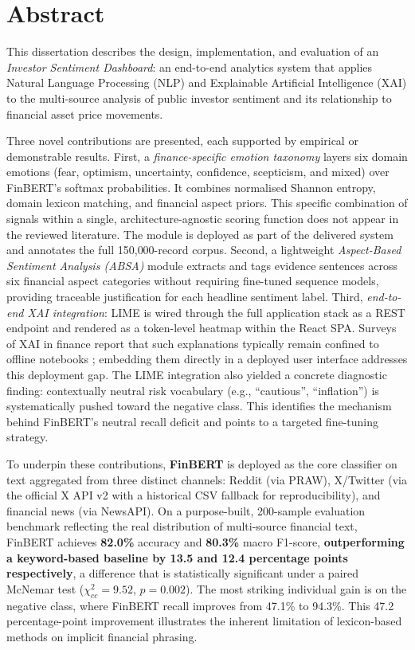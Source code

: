 \chapter*{Abstract}

This dissertation describes the design, implementation, and evaluation of an
\textit{Investor Sentiment Dashboard}: an end-to-end analytics system that applies
Natural Language Processing (NLP) and Explainable Artificial Intelligence (XAI)
to the multi-source analysis of public investor sentiment and its relationship to
financial asset price movements.

Three novel contributions are presented, each supported by empirical or
demonstrable results.
First, a \textit{finance-specific emotion taxonomy} layers six domain emotions
(fear, optimism, uncertainty, confidence, scepticism, and mixed) over FinBERT's
softmax probabilities. It combines normalised Shannon entropy, domain lexicon
matching, and financial aspect priors.
This specific combination of signals within a single, architecture-agnostic
scoring function does not appear in the reviewed literature. The module is
deployed as part of the delivered system and annotates the full
150{,}000-record corpus.
Second, a lightweight \textit{Aspect-Based Sentiment Analysis (ABSA)} module
extracts and tags evidence sentences across six financial aspect categories without
requiring fine-tuned sequence models, providing traceable justification for each
headline sentiment label.
Third, \textit{end-to-end XAI integration}: LIME \citep{ribeiro2016lime} is
wired through the full application stack as a REST endpoint and rendered as a
token-level heatmap within the React SPA. Surveys of XAI in finance report
that such explanations typically remain confined to offline notebooks
\citep{yeo2023xai, biswas2024xai}; embedding them directly in a deployed user
interface addresses this deployment gap.
The LIME integration also yielded a concrete diagnostic finding: contextually
neutral risk vocabulary (e.g., ``cautious'', ``inflation'') is systematically
pushed toward the negative class. This identifies the mechanism behind
FinBERT's neutral recall deficit and points to a targeted fine-tuning strategy.

To underpin these contributions, \textbf{FinBERT} \citep{araci2019finbert} is
deployed as the core classifier on text aggregated from three distinct channels:
Reddit (via PRAW), X/Twitter (via the official X API v2 with a historical CSV
fallback for reproducibility), and financial news (via NewsAPI).
On a purpose-built, 200-sample evaluation benchmark reflecting the real
distribution of multi-source financial text, FinBERT achieves \textbf{82.0\%}
accuracy and \textbf{80.3\%} macro F1-score, \textbf{outperforming a
keyword-based baseline by 13.5 and 12.4 percentage points respectively}, a
difference that is statistically significant under a paired McNemar test
($\chi^2_{cc} = 9.52$, $p = 0.002$).
The most striking individual gain is on the negative class, where FinBERT
recall improves from 47.1\% to 94.3\%. This 47.2 percentage-point improvement
illustrates the inherent limitation of lexicon-based methods on implicit
financial phrasing.

